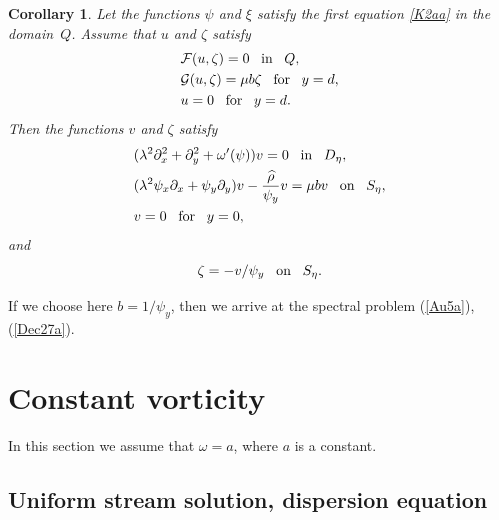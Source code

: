 \documentclass[oneside,a4paper,11pt]{article}
\newtheorem{corollary}[theorem]{Corollary}
\theoremstyle{thmstyletwo}%
\theoremstyle{thmstylethree}%
\numberwithin{equation}{section}
\begin{document}
\begin{corollary} Let the functions $\psi$ and $\xi$ satisfy the first equation\/ \eqref{K2aa} in the domain~$Q$.
Assume that\/ $u$ and\/ $\zeta$ satisfy
\begin{equation*} %
\begin{aligned}
&\mathcal{F}(u,\zeta)=0\quad\mbox{\!in\!}\quad Q,\\
&\mathcal{G}(u,\zeta)=\mu b\zeta\quad\mbox{\!for\!}\quad y=d,\\
&u=0\quad\mbox{\!for\!}\quad y=d.
\end{aligned}
\end{equation*}
Then the functions\/ $v$ and\/ $\zeta$ satisfy
\begin{equation*} %
\begin{aligned}
& (\lambda^2\partial_x^2+\partial_y^2+\omega'(\psi))v=0\quad\mbox{\!in\!}\quad D_\eta,\\
&(\lambda^2\psi_x\partial_x+\psi_y\partial_y) v-\frac{\widehat{\rho}}{\psi_y} v=\mu b v\quad\mbox{\!on\!}\quad S_\eta,\\
&v=0\quad\mbox{\!for\!}\quad y=0,
\end{aligned}
\end{equation*}
and
$$
\zeta=-v/\psi_y \quad\mbox{\!on\!}\quad S_\eta.
$$
\end{corollary}

If we choose here $b=1/\psi_y$, then we arrive at the spectral problem (\ref{Au5a}), (\ref{Dec27a}).

\section{Constant vorticity}

In this section we assume that $\omega=a$, where $a$ is a constant.

\subsection{Uniform stream solution, dispersion equation}\label{SAu13a}
\end{document}
